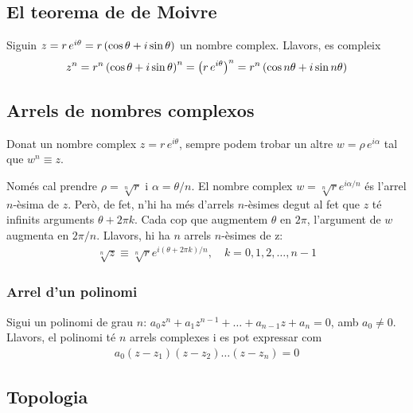 \subsection{El teorema de de Moivre}
\begin{thm}
    Siguin $z = r\,e^{i \theta} = r \left( \cos \theta + i \sin \theta \right) $ un nombre complex. Llavors, es compleix
    \begin{align}
        z^{n} = r^{n} \left( \cos \theta + i \sin \theta \right)^{n} = \left( r\,e^{i \theta} \right)^{n} = r^{n} \left( \cos n\theta + i \sin n\theta \right)
    \end{align}
\end{thm}

\subsection{Arrels de nombres complexos}
Donat un nombre complex $z = r\,e^{i\theta}$, sempre podem trobar un altre $w = \rho\,e^{i\alpha}$ tal que $w^{n} \equiv z$.

Només cal prendre $\rho = \sqrt[n]{r}$ i $\alpha = \theta / n$. El nombre complex $w = \sqrt[n]{r} e^{i\alpha / n}$ és l'arrel $n$-èsima de $z$. Però, de fet, n'hi ha més d'arrels $n$-èsimes degut al fet que $z$ té infinits arguments $\theta + 2 \pi k$. Cada cop que augmentem $\theta$ en $2\pi$, l'argument de $w$ augmenta en $2\pi / n$. Llavors, hi ha $n$ arrels $n$-èsimes de z:
\begin{align}
    \sqrt[n]{z} \equiv \sqrt[n]{r} e^{i(\theta + 2\pi k) / n}, \quad k = 0, 1, 2, \dots, n-1
\end{align}

\subsubsection*{Arrel d'un polinomi}
Sigui un polinomi de grau $n$: $a_{0}z^{n} + a_{1}z^{n-1} + \dots + a_{n-1} z + a_{n} = 0$, amb $a_{0} \neq 0$. Llavors, el polinomi té $n$ arrels complexes i es pot expressar com
\begin{align}
    a_{0} (z-z_{1}) (z-z_{2}) \dots (z-z_{n}) = 0
\end{align}

\subsection{Topologia}
